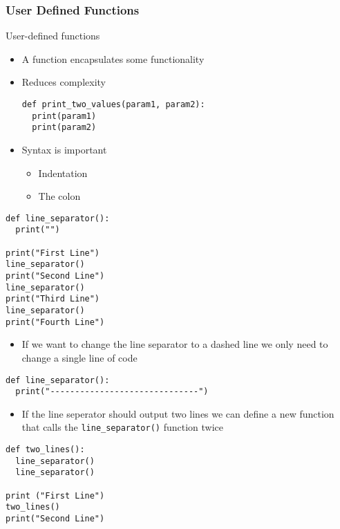 \documentclass[10pt, a4paper]{beamer} %
\begin{document}
\begin{frame}\frametitle{User Defined Functions}
	\begin{block}{User-defined functions}
		\begin{itemize}
			\item A function encapsulates some functionality
			\item Reduces complexity
			      \begin{lstlisting}
def print_two_values(param1, param2):
  print(param1)
  print(param2)
    \end{lstlisting}
			\item Syntax is important
			      \begin{itemize}
				      \item Indentation
				      \item The colon
			      \end{itemize}
		\end{itemize}
	\end{block}
	\framebreak
	\begin{examples}
		\begin{lstlisting}
def line_separator():
  print("")

print("First Line")
line_separator()
print("Second Line")
line_separator()
print("Third Line")
line_separator()
print("Fourth Line")
\end{lstlisting}
	\end{examples}
	\begin{itemize}
		\item If we want to change the line separator to a dashed line we only need to change a single line of code
	\end{itemize}
	\begin{lstlisting}
def line_separator():
  print("------------------------------")
\end{lstlisting}


	\framebreak

	\begin{examples}
		\begin{itemize}
			\item If the line seperator should output two lines we can define a new function that calls the \lstinline!line_separator()! function twice
		\end{itemize}
		\begin{lstlisting}
def two_lines():
  line_separator()
  line_separator()

print ("First Line")
two_lines()
print("Second Line")
  \end{lstlisting}
	\end{examples}


\end{frame}
\end{document}
